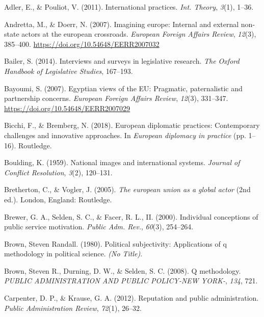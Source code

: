 \documentclass[
  letterpaper,
  DIV=11,
  numbers=noendperiod]{scrartcl}
\newlength{\cslhangindent}
\newenvironment{CSLReferences}[2] %
 {\begin{list}{}{%
  \setlength{\itemindent}{0pt}
  \setlength{\leftmargin}{0pt}
  \setlength{\parsep}{0pt}
  \ifodd #1
   \setlength{\leftmargin}{\cslhangindent}
   \setlength{\itemindent}{-1\cslhangindent}
  \fi
  \setlength{\itemsep}{#2\baselineskip}}}
 {\end{list}}
\begin{document}
\label{refs}
\begin{CSLReferences}{1}{0}
Adler, E., \& Pouliot, V. (2011). International practices. \emph{Int.
Theory}, \emph{3}(1), 1--36.

Andretta, M., \& Doerr, N. (2007). Imagining europe: Internal and
external non-state actors at the european crossroads. \emph{European
Foreign Affairs Review}, \emph{12}(3), 385--400.
\url{https://doi.org/10.54648/EERR2007032}

Bailer, S. (2014). Interviews and surveys in legislative research.
\emph{The Oxford Handbook of Legislative Studies}, 167--193.

Bayoumi, S. (2007). Egyptian views of the {EU}: Pragmatic, paternalistic
and partnership concerns. \emph{European Foreign Affairs Review},
\emph{12}(3), 331--347. \url{https://doi.org/10.54648/EERR2007029}

Bicchi, F., \& Bremberg, N. (2018). European diplomatic practices:
Contemporary challenges and innovative approaches. In \emph{European
diplomacy in practice} (pp. 1--16). Routledge.

Boulding, K. (1959). National images and international systems.
\emph{Journal of Conflict Resolution}, \emph{3}(2), 120--131.

Bretherton, C., \& Vogler, J. (2005). \emph{The european union as a
global actor} (2nd ed.). London, England: Routledge.

Brewer, G. A., Selden, S. C., \& Facer, R. L., II. (2000). Individual
conceptions of public service motivation. \emph{Public Adm. Rev.},
\emph{60}(3), 254--264.

Brown, Steven Randall. (1980). Political subjectivity: Applications of q
methodology in political science. \emph{(No Title)}.

Brown, Steven R., Durning, D. W., \& Selden, S. C. (2008). Q
methodology. \emph{PUBLIC ADMINISTRATION AND PUBLIC POLICY-NEW YORK-},
\emph{134}, 721.

Carpenter, D. P., \& Krause, G. A. (2012). Reputation and public
administration. \emph{Public Administration Review}, \emph{72}(1),
26--32.


\end{CSLReferences}
\end{document}
